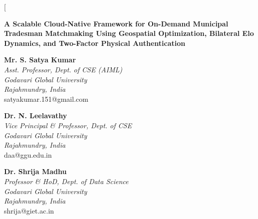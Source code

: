 \documentclass[10pt,twocolumn,a4paper]{article}
\begin{document}
\twocolumn[{
  \begin{center}
    {\Large \textbf{A Scalable Cloud-Native Framework for On-Demand Municipal Tradesman Matchmaking Using Geospatial Optimization, Bilateral Elo Dynamics, and Two-Factor Physical Authentication} \par}
    \vspace{0.6em}

    \begin{minipage}[t]{0.31\textwidth}
      \centering
      \textbf{Mr. S. Satya Kumar}\\
      \textit{Asst. Professor, Dept. of CSE (AIML)}\\
      \textit{Godavari Global University}\\
      \textit{Rajahmundry, India}\\
      satyakumar.151@gmail.com
    \end{minipage}
    \hfill
    \begin{minipage}[t]{0.31\textwidth}
      \centering
      \textbf{Dr. N. Leelavathy}\\
      \textit{Vice Principal \& Professor, Dept. of CSE}\\
      \textit{Godavari Global University}\\
      \textit{Rajahmundry, India}\\
      daa@ggu.edu.in
    \end{minipage}
    \hfill
    \begin{minipage}[t]{0.31\textwidth}
      \centering
      \textbf{Dr. Shrija Madhu}\\
      \textit{Professor \& HoD, Dept. of Data Science}\\
      \textit{Godavari Global University}\\
      \textit{Rajahmundry, India}\\
      shrija@giet.ac.in
    \end{minipage}

    \vspace{0.45em}


\end{center}}
\end{document}
